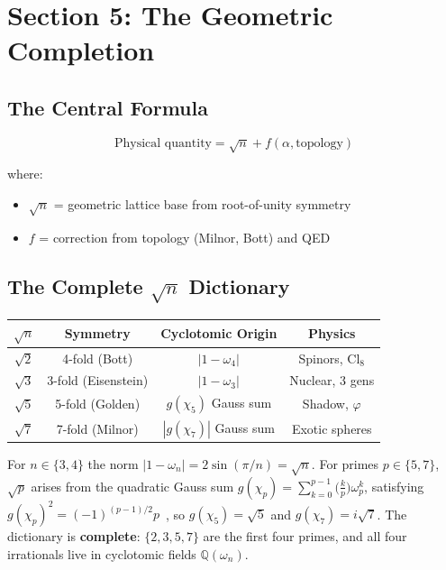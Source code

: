 \documentclass[aps,prd,twocolumn,superscriptaddress,floatfix,nofootinbib]{revtex4-2}
\theoremstyle{definition}
\theoremstyle{remark}
\begin{document}
\section{Section 5: The Geometric Completion}

\subsection{The Central Formula}

\begin{equation}
\boxed{\text{Physical quantity} = \sqrt{n} + f(\alpha, \text{topology})}
\end{equation}

where:
\begin{itemize}
\item $\sqrt{n}$ = geometric lattice base from root-of-unity symmetry
\item $f$ = correction from topology (Milnor, Bott) and QED
\end{itemize}

\subsection{The Complete $\sqrt{n}$ Dictionary}

\begin{center}
\begin{tabular}{cccc}
\toprule
$\sqrt{n}$ & Symmetry & Cyclotomic Origin & Physics \\
\midrule
$\sqrt{2}$ & 4-fold (Bott) & $|1 - \omega_4|$ & Spinors, Cl$_8$ \\
$\sqrt{3}$ & 3-fold (Eisenstein) & $|1 - \omega_3|$ & Nuclear, 3 gens \\
$\sqrt{5}$ & 5-fold (Golden) & $g(\chi_5)$ Gauss sum & Shadow, $\varphi$ \\
$\sqrt{7}$ & 7-fold (Milnor) & $|g(\chi_7)|$ Gauss sum & Exotic spheres \\
\bottomrule
\end{tabular}
\end{center}

\noindent For $n \in \{3,4\}$ the norm $|1-\omega_n| = 2\sin(\pi/n) = \sqrt{n}$.
For primes $p \in \{5,7\}$, $\sqrt{p}$ arises from the quadratic Gauss sum
$g(\chi_p) = \sum_{k=0}^{p-1} \bigl(\frac{k}{p}\bigr)\omega_p^k$,
satisfying $g(\chi_p)^2 = (-1)^{(p-1)/2}p$~\cite{Gauss1801},
so $g(\chi_5) = \sqrt{5}$ and $g(\chi_7) = i\sqrt{7}$.
The dictionary is \textbf{complete}: $\{2, 3, 5, 7\}$ are the first four primes,
and all four irrationals live in cyclotomic fields $\mathbb{Q}(\omega_n)$.
\end{document}
